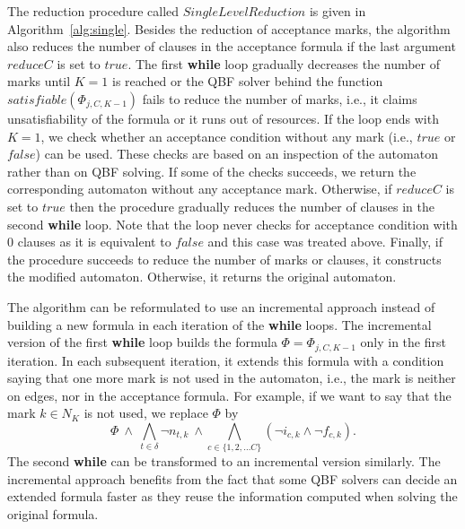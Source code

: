 \documentclass[runningheads]{llncs}
\def\false{\mathit{false}}
\def\true{\mathit{true}}
\begin{document}
The reduction procedure called $\mathit{SingleLevelReduction}$ is
given in Algorithm~\ref{alg:single}. Besides the reduction of
acceptance marks, the algorithm also reduces the number of clauses in the acceptance formula if the last argument $\mathit{reduceC}$ is set to
$\true$.
The first \textbf{while} loop gradually decreases the number of marks
until $K=1$ is reached or the QBF solver behind the function
$\mathit{satisfiable}(\Phi_{j,C,K{-}1})$ fails to reduce
the number of marks, i.e., it claims unsatisfiability of the formula
or it runs out of resources. If the loop ends with $K=1$, we check
whether an acceptance condition without any mark (i.e., $\true$ or
$\false$) can be used. These checks are based on an inspection of the
automaton rather than on QBF solving. If some of the checks succeeds,
we return the corresponding automaton without any acceptance
mark. Otherwise, if $\mathit{reduceC}$ is set to $\true$ then the
procedure gradually reduces the number of clauses in the second
\textbf{while} loop. Note that the loop never checks for acceptance
condition with 0 clauses as it is equivalent to $\false$ and this case
was treated above. Finally, if the procedure succeeds to reduce the
number of marks or clauses, it constructs the modified
automaton. Otherwise, it returns the original automaton.

The algorithm can be reformulated to use an incremental approach
instead of building a new formula in each iteration of the
\textbf{while} loops. The incremental version of the first
\textbf{while} loop builds the formula
$\Phi=\Phi_{j,C,K{-}1}$ only in the first iteration. In
each subsequent iteration, it extends this formula with a condition
saying that one more mark is not used in the automaton, i.e., the mark
is neither on edges, nor in the acceptance formula. For example, if we
want to say that the mark $k\in N_K$ is not used, we replace $\Phi$ by
\[
  \Phi~\wedge~\bigwedge_{t\in\delta}\neg n_{t,k}~\wedge\bigwedge_{c\in\{1,2,\ldots C\}}(\neg i_{c,k}\wedge\neg f_{c,k}).
\]
The second \textbf{while} can be transformed to an incremental version
similarly. The incremental approach benefits from the fact that some
QBF solvers can decide an extended formula faster as they reuse the
information computed when solving the original formula.
\end{document}
